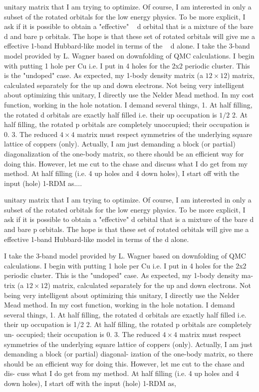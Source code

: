 \documentclass[prl,12pt,onecolumn,nofootinbib,notitlepage,english,superscriptaddress]{revtex4-1}
\newcommand{\HJC}[1]{{\color{RED}{\bf HJC: #1}}}
\begin{document}
unitary matrix that I am trying to optimize. Of course, I am
interested in only a subset of the rotated orbitals for the low
energy physics. To be more explicit, I ask if it is possible to
obtain a "effective" ~ d orbital that is a mixture of the bare d and
bare p orbitals. The hope is that these set of rotated orbitals
will give me a effective 1-band Hubbard-like model in terms
of the ~ d alone.
I take the 3-band model provided by L. Wagner based on
downfolding of QMC calculations. I begin with putting 1 hole
per Cu i.e. I put in 4 holes for the 2x2 periodic cluster. This
is the "undoped" case. As expected, my 1-body density matrix
(a $12\times12$) matrix, calculated separately for the up and
down electrons. Not being very intelligent about optimizing
this unitary, I directly use the Nelder Mead method. In my
cost function, working in the hole notation. I demand several
things,
1. At half filling, the rotated d orbitals are exactly half filled
i.e. their up occupation is $1/2$
2. At half filling, the rotated p orbitals are completely unoccupied;
their occupation is 0.
3. The reduced $4\times4$ matrix must respect symmetries of the
underlying square lattice of coppers (only).
Actually, I am just demanding a block (or partial) diagonalization
of the one-body matrix, so there should be an efficient
way for doing this. However, let me cut to the chase and discuss
what I do get from my method.
At half filling (i.e. 4 up holes and 4 down holes), I start off
with the input (hole) 1-RDM as....

\HJC{Need to show example...}
unitary matrix that I am trying to optimize.  Of course, I am
interested in only a subset of the rotated orbitals for the low
energy physics.  To be more explicit, I ask if it is possible to
obtain a "effective" d orbital that is a mixture of the bare d and
bare p orbitals.  The hope is that these set of rotated orbitals
will give me a effective 1-band Hubbard-like model in terms
of the d alone.

\HJC{What is my cost function....}
I take the 3-band model provided by L. Wagner based on
downfolding of QMC calculations. I begin with putting 1 hole
per Cu i.e.  I put in 4 holes for the 2x2 periodic cluster.  This
is the "undoped" case.  As expected, my 1-body density ma-
trix (a $12\times12$) matrix, calculated separately for the up and
down electrons.  Not being very intelligent about optimizing
this unitary,  I directly use the Nelder Mead method.  In my
cost function, working in the hole notation. I demand several
things,
1. At half filling, the rotated d orbitals are exactly half filled
i.e. their up occupation is 1/2
2.  At half filling, the rotated p orbitals are completely un-
occupied; their occupation is 0.
3. The reduced $4\times4$
matrix must respect symmetries of the
underlying square lattice of coppers (only).
Actually, I am just demanding a block (or partial) diagonal-
ization of the one-body matrix, so there should be an efficient
way for doing this.  However, let me cut to the chase and dis-
cuss what I do get from my method.
At half filling (i.e.
4 up holes and 4
down holes), I start off
with the input (hole) 1-RDM as,
\end{document}
